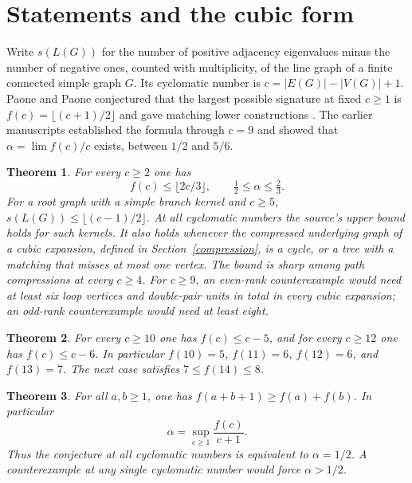 \documentclass[11pt]{article}
\newtheorem{theorem}{Theorem}[section]\newtheorem{lemma}[theorem]{Lemma}\newtheorem{corollary}[theorem]{Corollary}
\begin{document}
\section{Statements and the cubic form}
Write $s(L(G))$ for the number of positive adjacency eigenvalues minus the number of negative ones, counted with multiplicity, of the line graph of a finite connected simple graph $G$. Its cyclomatic number is $c=|E(G)|-|V(G)|+1$. Paone and Paone conjectured that the largest possible signature at fixed $c\ge1$ is $f(c)=\lfloor(c+1)/2\rfloor$ and gave matching lower constructions \cite[Theorem 5.3 and Conjecture 5.4]{PP}. The earlier manuscripts \cite{prev,finite} established the formula through $c=9$ and showed that $\alpha=\lim f(c)/c$ exists, between $1/2$ and $5/6$.
\begin{theorem}\label{main}
For every $c\ge2$ one has
\[
 f(c)\le \lfloor 2c/3\rfloor,
 \qquad \tfrac12\le\alpha\le\tfrac23.
\]
For a root graph with a simple branch kernel and $c\ge5$, $s(L(G))\le\lfloor(c-1)/2\rfloor$. At all cyclomatic numbers the source's upper bound holds for such kernels. It also holds whenever the compressed underlying graph of a cubic expansion, defined in Section~\ref{compression}, is a cycle, or a tree with a matching that misses at most one vertex. The bound is sharp among path compressions at every $c\ge4$. For $c\ge9$, an even-rank counterexample would need at least six loop vertices and double-pair units in total in every cubic expansion; an odd-rank counterexample would need at least eight.
\end{theorem}
\begin{theorem}\label{finite-theorem}
For every $c\ge10$ one has $f(c)\le c-5$, and for every $c\ge12$ one has $f(c)\le c-6$. In particular $f(10)=5$, $f(11)=6$, $f(12)=6$, and $f(13)=7$. The next case satisfies $7\le f(14)\le8$.
\end{theorem}
\begin{theorem}\label{gluing}
For all $a,b\ge1$, one has $f(a+b+1)\ge f(a)+f(b)$. In particular
\[
 \alpha=\sup_{c\ge1}\frac{f(c)}{c+1}.
\]
Thus the conjecture at all cyclomatic numbers is equivalent to $\alpha=1/2$. A counterexample at any single cyclomatic number would force $\alpha>1/2$.
\end{theorem}
\end{document}
